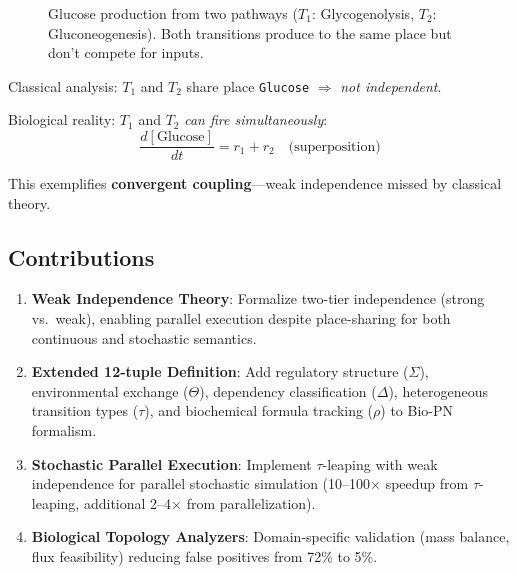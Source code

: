 \documentclass[twocolumn,11pt]{article}
\begin{document}
\begin{figure}[t]
\centering
{}
\caption{Glucose production from two pathways ($T_1$: Glycogenolysis, $T_2$: Gluconeogenesis). Both transitions produce to the same place but don't compete for inputs.}
\label{fig:glucose_example}
\end{figure}

Classical analysis: $T_1$ and $T_2$ share place \texttt{Glucose} $\Rightarrow$ \emph{not independent}.

Biological reality: $T_1$ and $T_2$ \emph{can fire simultaneously}:
\begin{equation}
\frac{d[\text{Glucose}]}{dt} = r_1 + r_2 \quad \text{(superposition)}
\end{equation}

This exemplifies \textbf{convergent coupling}---weak independence missed by classical theory.

\subsection{Contributions}

\begin{enumerate}
    \item \textbf{Weak Independence Theory}: Formalize two-tier independence (strong vs.\ weak), enabling parallel execution despite place-sharing for both continuous and stochastic semantics.
    
    \item \textbf{Extended 12-tuple Definition}: Add regulatory structure ($\Sigma$), environmental exchange ($\Theta$), dependency classification ($\Delta$), heterogeneous transition types ($\tau$), and biochemical formula tracking ($\rho$) to Bio-PN formalism.
    
    \item \textbf{Stochastic Parallel Execution}: Implement $\tau$-leaping with weak independence for parallel stochastic simulation (10--100$\times$ speedup from $\tau$-leaping, additional 2--4$\times$ from parallelization).
    
    \item \textbf{Biological Topology Analyzers}: Domain-specific validation (mass balance, flux feasibility) reducing false positives from 72\% to 5\%.
\end{enumerate}
\end{document}
